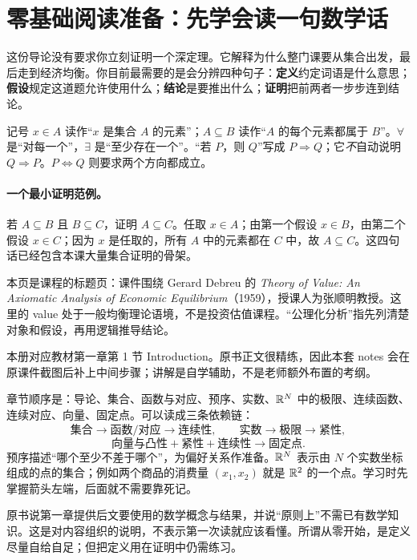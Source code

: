 \section*{零基础阅读准备：先学会读一句数学话}
这份导论没有要求你立刻证明一个深定理。它解释为什么整门课要从集合出发，最后走到经济均衡。你目前最需要的是会分辨四种句子：\textbf{定义}约定词语是什么意思；\textbf{假设}规定这道题允许使用什么；\textbf{结论}是要推出什么；\textbf{证明}把前两者一步步连到结论。

记号 $x\in A$ 读作“$x$ 是集合 $A$ 的元素”；$A\subseteq B$ 读作“$A$ 的每个元素都属于 $B$”。$\forall$ 是“对每一个”，$\exists$ 是“至少存在一个”。“若 $P$，则 $Q$”写成 $P\Rightarrow Q$；它\emph{不}自动说明 $Q\Rightarrow P$。$P\Leftrightarrow Q$ 则要求两个方向都成立。

\paragraph{一个最小证明范例。}若 $A\subseteq B$ 且 $B\subseteq C$，证明 $A\subseteq C$。任取 $x\in A$；由第一个假设 $x\in B$，由第二个假设 $x\in C$；因为 $x$ 是任取的，所有 $A$ 中的元素都在 $C$ 中，故 $A\subseteq C$。这四句话已经包含本课大量集合证明的骨架。

本页是课程的标题页：课件围绕 Gerard Debreu 的 \emph{Theory of Value: An Axiomatic Analysis of Economic Equilibrium}（1959），授课人为张顺明教授。这里的 value 处于一般均衡理论语境，不是投资估值课程。“公理化分析”指先列清楚对象和假设，再用逻辑推导结论。

本册对应教材第一章第 1 节 Introduction。原书正文很精练，因此本套 notes 会在原课件截图后补上中间步骤；讲解是自学辅助，不是老师额外布置的考纲。

章节顺序是：导论、集合、函数与对应、预序、实数、$\mathbb{R}^N$ 中的极限、连续函数、连续对应、向量、固定点。可以读成三条依赖链：
\[
\text{集合}\longrightarrow\text{函数/对应}\longrightarrow\text{连续性},\qquad
\text{实数}\longrightarrow\text{极限}\longrightarrow\text{紧性},
\]
\[
\text{向量与凸性}+\text{紧性}+\text{连续性}\longrightarrow\text{固定点}.
\]
预序描述“哪个至少不差于哪个”，为偏好关系作准备。$\mathbb{R}^N$ 表示由 $N$ 个实数坐标组成的点的集合；例如两个商品的消费量 $(x_1,x_2)$ 就是 $\mathbb{R}^2$ 的一个点。学习时先掌握箭头左端，后面就不需要靠死记。

原书说第一章提供后文要使用的数学概念与结果，并说“原则上”不需已有数学知识。这是对内容组织的说明，不表示第一次读就应该看懂。所谓从零开始，是定义尽量自给自足；但把定义用在证明中仍需练习。

